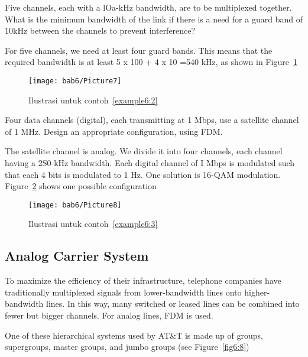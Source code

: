 \begin{example}
  Five channels, each with a lOa-kHz bandwidth, are to be multiplexed together. What is the minimum bandwidth of the link if there is a need for a guard band of 10kHz between the channels to prevent interference?
  \label{example6:2}
\end{example}

\begin{solution}
  For five channels, we need at least four guard bands. This means that the required bandwidth is at least 5 x 100 + 4 x 10 =540 kHz, as shown in Figure~\ref{fig6:6}
\end{solution}

\begin{figure}[htbp]
  \centering
  \texttt{[image: bab6/Picture7]}
  \caption{Ilustrasi untuk contoh~\ref{example6:2}}
  \label{fig6:6}
\end{figure}

\begin{example}
  Four data channels (digital), each transmitting at 1 Mbps, use a satellite channel of 1 MHz. Design an appropriate configuration, using FDM.
  \label{example6:3}
\end{example}

\begin{solution}
  The satellite channel is analog. We divide it into four channels, each channel having a 2S0-kHz bandwidth. Each digital channel of I Mbps is modulated such that each 4 bits is modulated to 1 Hz. One solution is 16-QAM modulation. Figure~\ref{fig6:7} shows one possible configuration
\end{solution}

\begin{figure}[htbp]
  \centering
  \texttt{[image: bab6/Picture8]}
  \caption{Ilustrasi untuk contoh~\ref{example6:3}}
  \label{fig6:7}
\end{figure}

\subsection*{Analog Carrier System}
To maximize the efficiency of their infrastructure, telephone companies have traditionally multiplexed signals from lower-bandwidth lines onto higher-bandwidth lines. In this way, many switched or leased lines can be combined into fewer but bigger channels. For analog lines, FDM is used.

One of these hierarchical systems used by AT\&T is made up of groups, supergroups, master groups, and jumbo groups (see Figure~\ref{fig6:8})

